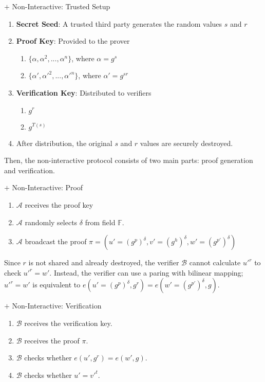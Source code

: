 \documentclass{article}
\begin{document}
\begin{protocol}{$+$ Non-Interactive: Trusted Setup}{}
\begin{enumerate}
    \item \textbf{Secret Seed}: A trusted third party generates the random values $s$ and $r$
    \item \textbf{Proof Key}: Provided to the prover \begin{enumerate}
        \item $\{\alpha, \alpha^2, ..., \alpha^{n}\}$, where $\alpha = g^{s}$
        \item $\{\alpha', \alpha'^2, ..., \alpha'^{n}\}$, where $\alpha' = g^{sr}$
        \end{enumerate}
    \item \textbf{Verification Key}: Distributed to verifiers \begin{enumerate}
        \item $g^{r}$
        \item $g^{T(s)}$
    \end{enumerate}
    \item After distribution, the original $s$ and $r$ values are securely destroyed.
\end{enumerate}
\end{protocol}



Then, the non-interactive protocol consists of two main parts: proof generation and verification.

\begin{protocol}{$+$ Non-Interactive: Proof}{}
    \begin{enumerate}
        \item $\mathcal{A}$ receives the proof key
        \item $\mathcal{A}$ randomly selects $\delta$ from field $\mathbb{F}$.
        \item $\mathcal{A}$ broadcast the proof $\pi = (u' = (g^{p})^{\delta}, v' = (g^{h})^{\delta}, w' = (g^{p'})^{\delta})$
    \end{enumerate}
\end{protocol}

Since $r$ is not shared and already destroyed, the verifier $\mathcal{B}$ cannot calculate $u'^{r}$ to check $u'^{r} = w'$. Instead, the verifier can use a paring with bilinear mapping; $u'^{r} = w'$ is equivalent to $e(u' = (g^{p})^{\delta}, g^{r}) = e(w'=(g^{p'})^{\delta}, g)$.

\begin{protocol}{$+$ Non-Interactive: Verification}{}
    \begin{enumerate}
        \item $\mathcal{B}$ receives the verification key.
        \item $\mathcal{B}$ receives the proof $\pi$.
        \item $\mathcal{B}$ checks whether $e(u', g^{r}) = e(w', g)$.
        \item $\mathcal{B}$ checks whether $u' = v'^{t}$.
    \end{enumerate}
\end{protocol}
\end{document}
